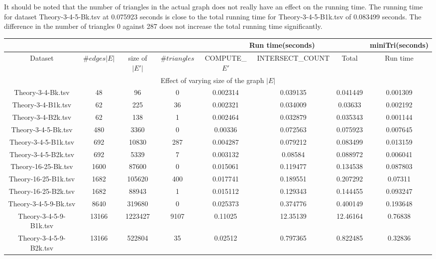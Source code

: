 \documentclass[conference]{IEEEtran}
\begin{document}
It should be noted that the number of triangles in the actual graph does not really have an effect on the running time. The running time for dataset Theory-3-4-5-Bk.tsv at 0.075923 seconds is close to the total running time for Theory-3-4-5-B1k.tsv of 0.083499 seconds. The difference in the number of triangles 0 against 287 does not increase the total running time significantly.

\begin{table*}[ht]
\centering
 \begin{tabular}{|c || c | c | c || c | c | c || c |} 
 \hline
 \multicolumn{4}{|c||}{}&\multicolumn{3}{|c||}{Run time(seconds)}&\multicolumn{1}{|c|}{miniTri(seconds)} \\
 \hline
 Dataset & $\#edges |E|$ & size of $|E'|$ & $\#triangles$ & COMPUTE\_$E'$ & INTERSECT\_COUNT & Total & Run time \\ [0.5ex] 
 \hline
 \multicolumn{8}{c}{Effect of varying size of the graph $|E|$} \\
 \hline
 Theory-3-4-Bk.tsv & 48 & 96 & 0 & 0.002314 & 0.039135 & 0.041449 & 0.001309 \\
 \hline
 Theory-3-4-B1k.tsv & 62 & 225 & 36 & 0.002321 & 0.034009 & 0.03633 & 0.002192 \\
 \hline
 Theory-3-4-B2k.tsv & 62 & 138 & 1 & 0.002464 & 0.032879 & 0.035343 & 0.001144 \\
 \hline
 Theory-3-4-5-Bk.tsv & 480 & 3360 & 0 & 0.00336 & 0.072563 & 0.075923 & 0.007645 \\
 \hline
 Theory-3-4-5-B1k.tsv & 692 & 10830 & 287 & 0.004287 & 0.079212 & 0.083499 & 0.013159 \\
 \hline
 Theory-3-4-5-B2k.tsv & 692 & 5339 & 7 & 0.003132 & 0.08584 & 0.088972 & 0.006041 \\
 \hline
 Theory-16-25-Bk.tsv & 1600 & 87600 & 0 & 0.015061 & 0.119477 & 0.134538 & 0.087803 \\
 \hline
 Theory-16-25-B1k.tsv & 1682 & 105620 & 400 & 0.017741 & 0.189551 & 0.207292 & 0.07311 \\
 \hline
 Theory-16-25-B2k.tsv & 1682 & 88943 & 1 & 0.015112 & 0.129343 & 0.144455 & 0.093247 \\
 \hline
 Theory-3-4-5-9-Bk.tsv & 8640 & 319680 & 0 & 0.025373 & 0.374776 & 0.400149 & 0.193648 \\
 \hline
 Theory-3-4-5-9-B1k.tsv & 13166 & 1223427 & 9107 & 0.11025 & 12.35139 & 12.46164 & 0.76838 \\
 \hline
 Theory-3-4-5-9-B2k.tsv & 13166 & 522804 & 35 & 0.02512 & 0.797365 & 0.822485 & 0.32836 \\

\end{tabular}
\end{table*}
\end{document}
